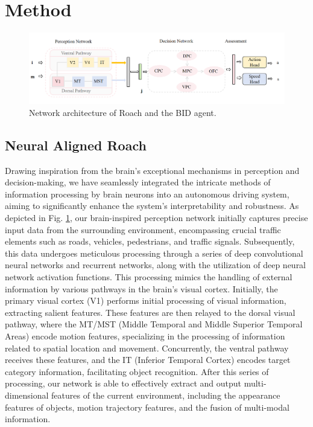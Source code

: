 \section{Method}
\begin{figure}[t]
	\centering
	\includegraphics[width=\linewidth]{net.png}
	
	\caption{Network architecture of Roach and the BID agent.
	}
	\label{fig:fig2}
\end{figure}
\subsection{Neural Aligned Roach}
\hspace{1pc}Drawing inspiration from the brain's exceptional mechanisms in perception and decision-making, we have seamlessly integrated the intricate methods of information processing by brain neurons into an autonomous driving system, aiming to significantly enhance the system's interpretability and robustness. As depicted in Fig. \ref{fig:fig2}, our brain-inspired perception network initially captures precise input data from the surrounding environment, encompassing crucial traffic elements such as roads, vehicles, pedestrians, and traffic signals. Subsequently, this data undergoes meticulous processing through a series of deep convolutional neural networks and recurrent networks, along with the utilization of deep neural network activation functions. This processing mimics the handling of external information by various pathways in the brain's visual cortex. Initially, the primary visual cortex (V1) performs initial processing of visual information, extracting salient features. These features are then relayed to the dorsal visual pathway, where the MT/MST (Middle Temporal and Middle Superior Temporal Areas) encode motion features, specializing in the processing of information related to spatial location and movement. Concurrently, the ventral pathway receives these features, and the IT (Inferior Temporal Cortex) encodes target category information, facilitating object recognition. After this series of processing, our network is able to effectively extract and output multi-dimensional features of the current environment, including the appearance features of objects, motion trajectory features, and the fusion of multi-modal information.

